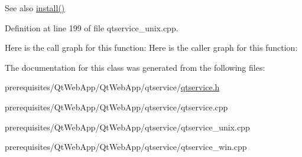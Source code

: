 \begin{DoxySeeAlso}{See also}
\mbox{\hyperlink{class_qt_service_controller_a7e2b85e911ff152557dd25959e76094b}{install()}} 
\end{DoxySeeAlso}


Definition at line 199 of file qtservice\+\_\+unix.\+cpp.

Here is the call graph for this function\+:
Here is the caller graph for this function\+:


The documentation for this class was generated from the following files\+:\begin{DoxyCompactItemize}
\item 
prerequisites/\+Qt\+Web\+App/\+Qt\+Web\+App/qtservice/\mbox{\hyperlink{qtservice_8h}{qtservice.\+h}}\item 
prerequisites/\+Qt\+Web\+App/\+Qt\+Web\+App/qtservice/qtservice.\+cpp\item 
prerequisites/\+Qt\+Web\+App/\+Qt\+Web\+App/qtservice/qtservice\+\_\+unix.\+cpp\item 
prerequisites/\+Qt\+Web\+App/\+Qt\+Web\+App/qtservice/qtservice\+\_\+win.\+cpp\end{DoxyCompactItemize}
